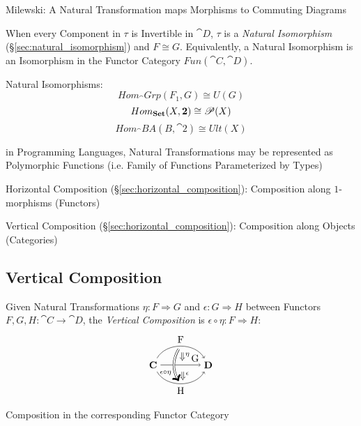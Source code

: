 Milewski: A Natural Transformation maps Morphisms to Commuting
Diagrams

When every Component in $\tau$ is Invertible in $\cat{D}$, $\tau$ is a
\emph{Natural Isomorphism} (\S\ref{sec:natural_isomorphism}) and $F
\cong G$. Equivalently, a Natural Isomorphism is an Isomorphism in the
Functor Category $Fun(\cat{C},\cat{D})$.

Natural Isomorphisms:
\[
  Hom_\cat{Grp}(F_1,G) \cong U(G)
\]\[
  Hom_\mathbf{Set}(X,\mathbf{2}) \cong \mathscr{P}(X)
\]\[
  Hom_\cat{BA}(B,\cat{2}) \cong Ult(X)
\]

in Programming Languages, Natural Transformations may be represented
as Polymorphic Functions (i.e. Family of Functions Parameterized by
Types)

Horizontal Composition (\S\ref{sec:horizontal_composition}):
Composition along $1$-morphisms (Functors)

Vertical Composition (\S\ref{sec:horizontal_composition}):
Composition along Objects (Categories)



\subsection{Vertical Composition}\label{sec:vertical_composition}

Given Natural Transformations $\eta : F \Rightarrow G$ and $\epsilon :
G \Rightarrow H$ between Functors $F,G,H : \cat{C} \rightarrow
\cat{D}$, the \emph{Vertical Composition} is $\epsilon\circ\eta : F
\Rightarrow H$:
\[
  \begin{tikzpicture}
    \node (C) at (-1,0) {$\cat{C}$};
    \node (D) at (1,0) {$\cat{D}$};
    \node (N) at (0,0.3) {$\;\;\;\Downarrow^\eta$};
    \node (M) at (0,-0.4) {$\;\;\;\Downarrow^\epsilon$};
    \node (F) at (0,0.7) {};
    \node (H) at (0,-0.7) {};
    \draw[->,bend left=60] (C) to node [above] {F} (D);
    \draw[->] (C) to node [above] {\quad\quad\quad G} (D);
    \draw[->,bend right=60] (C) to node [below] {H} (D);
    \draw[->,bend right=30,double distance=1.5pt] (F) to
      node [left,pos=0.75] {$_{\epsilon\circ\eta}$} (H);
  \end{tikzpicture}
\]

Composition in the corresponding Functor Category



